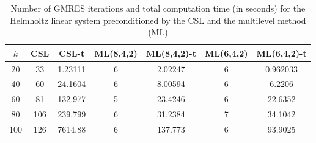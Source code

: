 \begin{table}[t]
\centering
\begin{tabular}{ccccccc}
\hline
$k$ & CSL & CSL-t & ML(8,4,2) & ML(8,4,2)-t& ML(6,4,2) & ML(6,4,2)-t \\ \hline
20 & 33 & 1.23111 & 6   & 2.02247 & 6 & 0.962033 \\
40 & 60 & 24.1604 & 6   & 8.00594 & 6 & 6.2206 \\
60 & 81 & 132.977 & 5   & 23.4246 & 6 & 22.6352 \\
80 & 106 & 239.799 & 6  & 31.2384 & 7 & 34.1042 \\
100 & 126 & 7614.88 & 6 & 137.773 & 6 & 93.9025 \\
\hline
\end{tabular}
\caption{Number of GMRES iterations and total computation time (in seconds) for the Helmholtz linear system preconditioned by the  CSL and the multilevel method (ML)}
\label{table:mlgmres_csl_vs_adef_coarse_eps_10}
\end{table}

